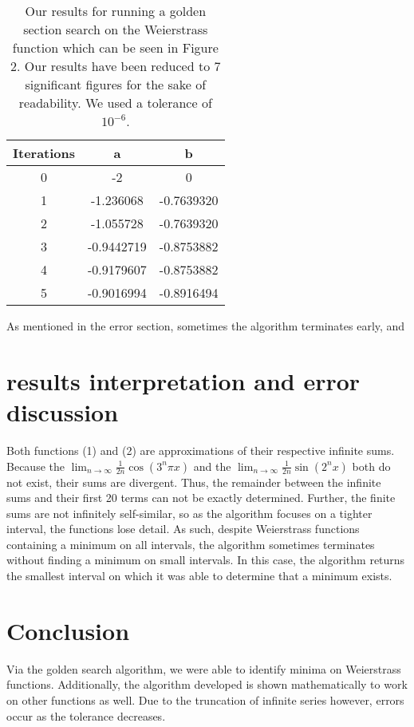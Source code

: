 \documentclass[linenumbers,RNAAS,trackchanges]{aastex631}
\begin{document}
\begin{table}[H]
    \centering
    \begin{tabular}{|c|c|c|}
         \hline
         Iterations &  a & b \\
         \hline
         0 & -2 & 0 \\
         \hline
         1 & -1.236068 & -0.7639320 \\
         \hline
         2 & -1.055728 & -0.7639320 \\
         \hline
         3 & -0.9442719 & -0.8753882 \\
         \hline
         4 & -0.9179607 & -0.8753882 \\
         \hline
         5 & -0.9016994 & -0.8916494 \\
         \hline
    \end{tabular}
    \caption{Our results for running a golden section search on the Weierstrass function which can be seen in Figure 2. Our results have been reduced to 7 significant figures for the sake of readability. We used a tolerance of $10^{-6}$.} As mentioned in the error section, sometimes the algorithm terminates early, and 
    \label{tab:data_tab}
\end{table}






\section{\textbf{results interpretation and error discussion}}
Both functions (1) and (2) are approximations of their respective infinite sums. Because the $\lim_{n \to \infty} \frac{1}{2n} \cos{(3^n \pi x)}$ and the  $\lim_{n \to \infty} \frac{1}{2n} \sin{(2^n x)}$ both do not exist, their sums are divergent. Thus, the remainder between the infinite sums and their first 20 terms can not be exactly determined. Further, the finite sums are not infinitely self-similar, so as the algorithm focuses on a tighter interval, the functions lose detail. As such, despite Weierstrass functions containing a minimum on all intervals, the algorithm sometimes terminates without finding a minimum on small intervals. In this case, the algorithm returns the smallest interval on which it was able to determine that a minimum exists.

\section{\textbf{Conclusion}} \label{sec:summary}
Via the golden search algorithm, we were able to identify minima on Weierstrass functions. Additionally, the algorithm developed is shown mathematically to work on other functions as well. Due to the truncation of infinite series however, errors occur as the tolerance decreases.
\end{document}
